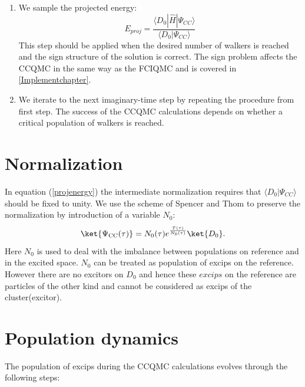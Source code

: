 \documentclass[twoside,english]{uiofysmaster}
\begin{document}
\begin{enumerate}
	\item We sample the projected energy: 
	\begin{equation}\label{projenergy}
	E_{proj} = \frac{\langle D_0|\hat{H}|\Psi_{CC} \rangle}{\langle D_0|\Psi_{CC} \rangle}
	\end{equation}
	This step should be applied when the desired number of walkers is reached and the sign structure of the solution is correct. The sign problem affects the CCQMC in the same way as the FCIQMC and is covered in \autoref{Implementchapter}.
	\item We iterate to the next imaginary-time step by repeating the procedure from first step. The 
	success of the CCQMC calculations depends on whether a critical population of walkers is reached.
\end{enumerate}

\section{Normalization}

In equation (\ref{projenergy}) the intermediate normalization requires
that $\langle D_0|\Psi_{CC} \rangle$ should be fixed to unity. We use the scheme of 
Spencer and Thom
\cite{SpencerDevelopmentsstochasticcoupled2016} to preserve the
normalization by introduction of a variable $N_0$:
\begin{equation}\label{eq:exptauloop}
\ket{\Psi_{\text{CC}}(\tau)}=N_0(\tau) e^{\frac{\hat{T}(\tau)}{N_0(\tau)}} \ket{D_0}.
\end{equation}
Here $N_0$ is used to deal with the imbalance between populations on reference and in the excited space. $N_0$ can be treated as population of excips on the reference. However there are no excitors on $D_0$ and hence these $excips$ on the reference are particles of the other kind and cannot be considered as excips of the cluster(excitor).   



\section{Population dynamics}

The population of excips during the CCQMC calculations evolves through the following steps: 
\end{document}
